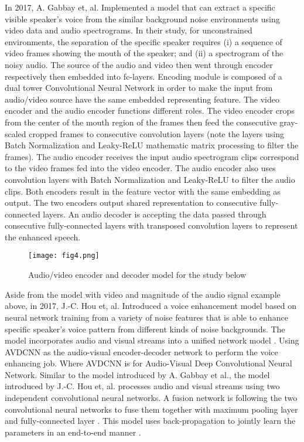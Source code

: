\documentclass[runningheads,a4paper]{llncs}
\begin{document}
In 2017, A. Gabbay et, al. \cite{8} Implemented a model that can extract a specific visible speaker’s voice from the similar background noise environments using video data and audio spectrograms. In their study, for unconstrained environments, the separation of the specific speaker requires (i) a sequence of video frames showing the mouth of the speaker; and (ii) a spectrogram of the noisy audio. The source of the audio and video then went through encoder respectively then embedded into fc-layers. Encoding module is composed of a dual tower Convolutional Neural Network in order to make the input from audio/video source have the same embedded representing feature. The video encoder and the audio encoder functions different roles. The video encoder crops from the center of the mouth region of the frames then feed the consecutive gray-scaled cropped frames to consecutive convolution layers (note the layers using Batch Normalization \cite{9} and Leaky-ReLU \cite{10} mathematic matrix processing to filter the frames). The audio encoder receives the input audio spectrogram clips correspond to the video frames fed into the video encoder. The audio encoder also uses convolution layers with Batch Normalization \cite{9} and Leaky-ReLU \cite{10} to filter the audio clips. Both encoders result in the feature vector with the same embedding as output. The two encoders output shared representation to consecutive fully-connected layers. An audio decoder is accepting the data passed through consecutive fully-connected layers with transposed convolution layers to represent the enhanced speech.\\

\begin{figure}[h!]
\texttt{[image: fig4.png]}
\caption{Audio/video encoder and decoder model for the study below}
\label{fig:framework}
\end{figure}
 
Aside from the model with video and magnitude of the audio signal example above, \cite{11} in 2017, J.-C. Hou et, al. Introduced a voice enhancement model based on neural network training from a variety of noise features that is able to enhance specific speaker’s voice pattern from different kinds of noise backgrounds. The model incorporates audio and visual streams into a unified network model \cite{12}. Using AVDCNN as the audio-visual encoder-decoder network to perform the voice enhancing job. Where AVDCNN is for Audio-Visual Deep Convolutional Neural Network. Similar to the model introduced by A. Gabbay et al., the model introduced by J.-C. Hou et, al. processes audio and visual streams using two independent convolutional neural networks. A fusion network is following the two convolutional neural networks to fuse them together with maximum pooling layer and fully-connected layer \cite{11}.
This model uses back-propagation to jointly learn the parameters in an end-to-end manner \cite{12}.\\
\end{document}
